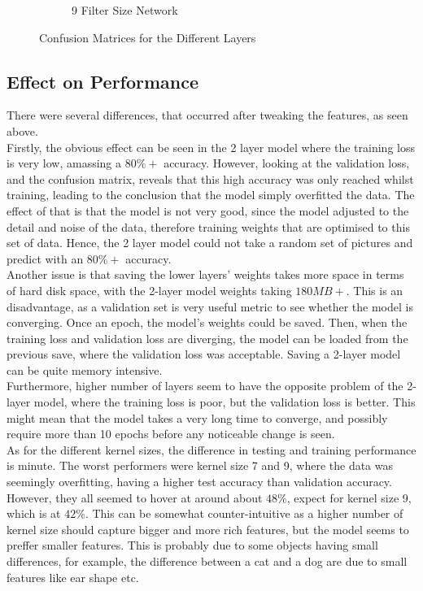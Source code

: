 \documentclass{article}
\begin{document}
\begin{figure}[h!]
\begin{subfigure}[t]{0.45\textwidth}
            \caption{9 Filter Size Network}
        \end{subfigure}
        \caption{Confusion Matrices for the Different Layers}
    \end{figure}

    \subsection{Effect on Performance}
    There were several differences, that occurred after tweaking the features, as seen above.\\

    Firstly, the obvious effect can be seen in the 2 layer model where the training loss is very low, amassing a $80\%+$ accuracy. However, looking at the validation loss, and the confusion matrix, reveals that this high accuracy was only reached whilst training, leading to the conclusion that the model simply overfitted the data. The effect of that is that the model is not very good, since the model adjusted to the detail and noise of the data, therefore training weights that are optimised to this set of data. Hence, the 2 layer model could not take a random set of pictures and predict with an $80\%+$ accuracy.\\

    Another issue is that saving the lower layers' weights takes more space in terms of hard disk space, with the 2-layer model weights taking $180MB+$. This is an disadvantage, as a validation set is very useful metric to see whether the model is converging. Once an epoch, the model's weights could be saved. Then, when the training loss and validation loss are diverging, the model can be loaded from the previous save, where the validation loss was acceptable. Saving a 2-layer model can be quite memory intensive.\\

    Furthermore, higher number of layers seem to have the opposite problem of the 2-layer model, where the training loss is poor, but the validation loss is better. This might mean that the model takes a very long time to converge, and possibly require more than 10 epochs before any noticeable change is seen.\\

    As for the different kernel sizes, the difference in testing and training performance is minute. The worst performers were kernel size 7 and 9, where the data was seemingly overfitting, having a higher test accuracy than validation accuracy. However, they all seemed to hover at around about $48\%$, expect for kernel size 9, which is at $42\%$. This can be somewhat counter-intuitive as a higher number of kernel size should capture bigger and more rich features, but the model seems to preffer smaller features. This is probably due to some objects having small differences, for example, the difference between a cat and a dog are due to small features like ear shape etc.\\
\end{document}
